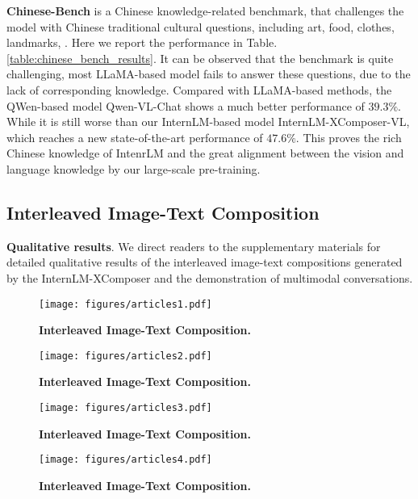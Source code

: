 \documentclass[10pt,twocolumn,letterpaper]{article}
\begin{document}
\noindent\textbf{Chinese-Bench} is a Chinese knowledge-related benchmark, that challenges the model with Chinese traditional cultural questions, including art, food, clothes, landmarks, \etc.  
Here we report the performance in Table.\ref{table:chinese_bench_results}. It can be observed that the benchmark is quite challenging, most LLaMA-based model fails to answer these questions, due to the lack of corresponding knowledge. Compared with LLaMA-based methods, the QWen-based model Qwen-VL-Chat shows a much better performance of $39.3\%$. While it is still worse than our InternLM-based model InternLM-XComposer-VL, which reaches a new state-of-the-art performance of $47.6\%$. This proves the rich Chinese knowledge of IntenrLM and the great alignment between the vision and language knowledge by our large-scale pre-training.

\subsection{Interleaved Image-Text Composition}



\noindent\textbf{Qualitative results}. We direct readers to the supplementary materials for detailed qualitative results of the interleaved image-text compositions generated by the InternLM-XComposer and the demonstration of multimodal conversations.


\begin{figure*}[t!]
	\centering
	\texttt{[image: figures/articles1.pdf]}
	\caption{\textbf{Interleaved Image-Text Composition.} }
	\label{fig:article1}
\end{figure*}

\begin{figure*}[t!]
	\centering
	\texttt{[image: figures/articles2.pdf]}
	\caption{\textbf{Interleaved Image-Text Composition.} }
	\label{fig:article2}
\end{figure*}

\begin{figure*}[t!]
	\centering
	\texttt{[image: figures/articles3.pdf]}
	\caption{\textbf{Interleaved Image-Text Composition.} }
	\label{fig:article2}
\end{figure*}

\begin{figure*}[t!]
	\centering
	\texttt{[image: figures/articles4.pdf]}
	\caption{\textbf{Interleaved Image-Text Composition.} }
	\label{fig:article2}
\end{figure*}
\end{document}
